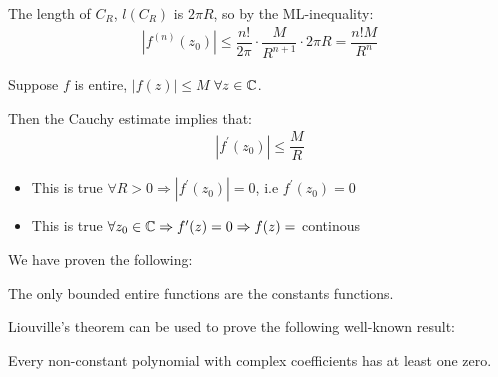 \par\bigskip
\noindent The length of $C_R$, $l(C_R)$ is $2\pi R$, so by the ML-inequality:
\begin{equation*}
  \begin{gathered}
    \left|f^{(n)}(z_0)\right|\leq\dfrac{n!}{2\pi}\cdot\dfrac{M}{R^{n+1}}\cdot2\pi R = \dfrac{n!M}{R^n}
  \end{gathered}
\end{equation*}
\par\bigskip
\noindent Suppose $f$ is entire, $\left|f(z)\right|\leq M$ $\forall z\in\mathbb{C}$.\par
\noindent Then the Cauchy estimate implies that:
\begin{equation*}
  \begin{gathered}
    \left|f^{\prime}(z_0)\right|\leq\dfrac{M}{R}
  \end{gathered}
\end{equation*}
\par\bigskip
\begin{itemize}
  \item This is true $\forall R>0\Rightarrow \left|f^{\prime}(z_0)\right| = 0$, i.e $f^{\prime}(z_0) = 0$
  \item This is true $\forall z_0\in\mathbb{C}\Rightarrow f^{\prime}(z) = 0\Rightarrow f(z) = $ continous
\end{itemize}
\par\bigskip
\noindent We have proven the following:
\par\bigskip
\begin{theo}[Liouville]{}
  The only bounded entire functions are the constants functions.
\end{theo}
\par\bigskip
\noindent Liouville's theorem can be used to prove the following well-known result:
\par\bigskip
\begin{theo}{}
  Every non-constant polynomial with complex coefficients has at least one zero. 
\end{theo}
\newpage
